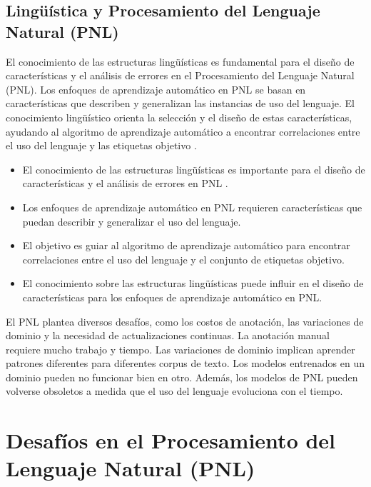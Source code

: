 \documentclass{book}
\begin{document}
\subsection{Lingüística y Procesamiento del Lenguaje Natural (PNL)}

El conocimiento de las estructuras lingüísticas es fundamental para el diseño de características y el análisis de errores en el Procesamiento del Lenguaje Natural (PNL). Los enfoques de aprendizaje automático en PNL se basan en características que describen y generalizan las instancias de uso del lenguaje. El conocimiento lingüístico orienta la selección y el diseño de estas características, ayudando al algoritmo de aprendizaje automático a encontrar correlaciones entre el uso del lenguaje y las etiquetas objetivo \cite{bender2013linguistic}.

\begin{itemize}
  \item El conocimiento de las estructuras lingüísticas es importante para el diseño de características y el análisis de errores en PNL \cite{bender2013linguistic}.
  \item Los enfoques de aprendizaje automático en PNL requieren características que puedan describir y generalizar el uso del lenguaje.
  \item El objetivo es guiar al algoritmo de aprendizaje automático para encontrar correlaciones entre el uso del lenguaje y el conjunto de etiquetas objetivo.
  \item El conocimiento sobre las estructuras lingüísticas puede influir en el diseño de características para los enfoques de aprendizaje automático en PNL.
\end{itemize}

El PNL plantea diversos desafíos, como los costos de anotación, las variaciones de dominio y la necesidad de actualizaciones continuas. La anotación manual requiere mucho trabajo y tiempo. Las variaciones de dominio implican aprender patrones diferentes para diferentes corpus de texto. Los modelos entrenados en un dominio pueden no funcionar bien en otro. Además, los modelos de PNL pueden volverse obsoletos a medida que el uso del lenguaje evoluciona con el tiempo.




\section{Desafíos en el Procesamiento del Lenguaje Natural (PNL)}
\end{document}
